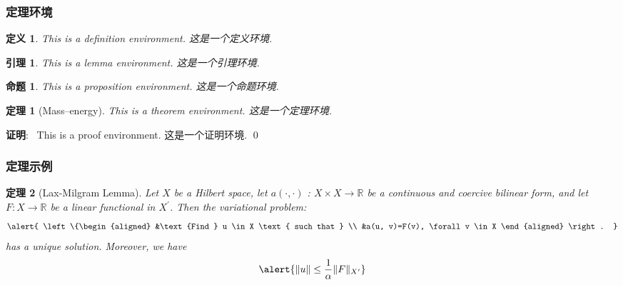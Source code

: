 \documentclass[notheorems]{beamer}
\theoremstyle{plain}
\newtheorem{theorem}{\sffamily 定理}
\numberwithin{theorem}{section}
\newtheorem{definition}{\sffamily 定义}
\numberwithin{definition}{section}
\newtheorem{lemma}{\sffamily 引理}
\numberwithin{lemma}{section}
\newtheorem{proposition}{\sffamily 命题}
\numberwithin{proposition}{section}
\numberwithin{corollary}{section}
\theoremstyle{example}
\renewenvironment{proof}[1][证明]{\textbf{#1}:~}{\qed\par}
\numberwithin{figure}{section}
\numberwithin{table}{section}
\numberwithin{equation}{section}
\begin{document}
\begin{frame}
\frametitle{定理环境}
\begin{definition} \upshape\rmfamily
This is a definition environment. 这是一个定义环境.
\end{definition}


\begin{lemma} \upshape\rmfamily
This is a lemma environment. 这是一个引理环境.
\end{lemma}

\begin{proposition} \upshape\rmfamily
This is a proposition environment. 这是一个命题环境.
\end{proposition}

\begin{theorem}[Mass--energy] \upshape\rmfamily
This is a theorem environment. 这是一个定理环境.
\end{theorem}

\begin{proof}
  This is a proof environment. 这是一个证明环境.
\end{proof}

\end{frame}



\begin{frame}
\frametitle{定理示例}

\begin{theorem}[Lax-Milgram Lemma] \upshape
Let $X$ be a Hilbert space, let $a(\cdot, \cdot)$ : $X \times X \rightarrow \mathbb{R}$ be a continuous and coercive bilinear form, and let $F : X \rightarrow \mathbb{R}$ be a linear functional in $X^{\prime}$. Then the variational problem:
\begin{equation}
  \alert{
  \left\{\begin{aligned}
  &\text {Find } u \in X \text { such that } \\
  &a(u, v)=F(v), \forall v \in X
  \end{aligned} \right. }
\end{equation}
has a unique solution. Moreover, we have
\begin{equation}
  \alert{ \|u\| \leq \frac{1}{\alpha}\|F\|_{X^{\prime}}  }
\end{equation}
\end{theorem}

\end{frame}

\end{document}
